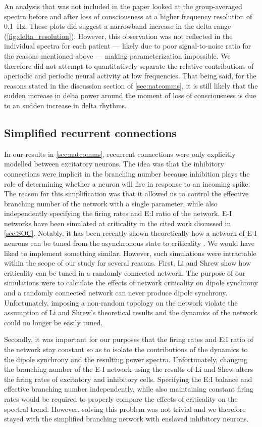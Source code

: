 An analysis that was not included in the paper looked at the group-averaged spectra before and after loss of consciousness at a higher frequency resolution of \qty{0.1}{\hertz}. These plots did suggest a narrowband increase in the delta range (\autoref{fig:delta_resolution}). However, this observation was not reflected in the individual spectra for each patient --- likely due to poor signal-to-noise ratio for the reasons mentioned above –-- making parameterization impossible. We therefore did not attempt to quantitatively separate the relative contributions of aperiodic and periodic neural activity at low frequencies. That being said, for the reasons stated in the discussion section of \autoref{sec:natcomms}, it is still likely that the sudden increase in delta power around the moment of loss of consciousness is due to an sudden increase in delta rhythms.

\subsection{Simplified recurrent connections}
In our results in \autoref{sec:natcomms}, recurrent connections were only explicitly modelled between excitatory neurons. The idea was that the inhibitory connections were implicit in the branching number because inhibition plays the role of determining whether a neuron will fire in response to an incoming spike. The reason for this simplification was that it allowed us to control the effective branching number of the network with a single parameter, while also independently specifying the firing rates and E:I ratio of the network. E-I networks have been simulated at criticality in the cited work discussed in \autoref{sec:SOC}. Notably, it has been recently shown theoretically how a network of E-I neurons can be tuned from the asynchronous state to criticality \cite{Li2020}. We would have liked to implement something similar. However, such simulations were intractable within the scope of our study for several reasons. First, Li and Shrew \cite{Li2020} show how criticality can be tuned in a randomly connected network. The purpose of our simulations were to calculate the effects of network criticality on dipole synchrony and a randomly connected network can never produce dipole synchrony. Unfortunately, imposing a non-random topology on the network violate the assumption of Li and Shrew's theoretical results \cite{Li2020} and the dynamics of the network could no longer be easily tuned. 

Secondly, it was important for our purposes that the firing rates and E:I ratio of the network stay constant so as to isolate the contributions of the dynamics to the dipole synchrony and the resulting power spectra. Unfortunately, changing the branching number of the E-I network using the results of Li and Shew \cite{Li2020} alters the firing rates of excitatory and inhibitory cells. Specifying the E:I balance and effective branching number independently, while also maintaining constant firing rates would be required to properly compare the effects of criticality on the spectral trend. However, solving this problem was not trivial and we therefore stayed with the simplified branching network with enslaved inhibitory neurons.

